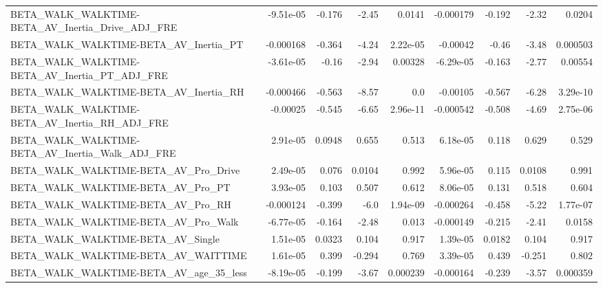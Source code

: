 \begin{tabular}{lrrrrrrrr}
BETA\_WALK\_WALKTIME-BETA\_AV\_Inertia\_Drive\_ADJ\_FRE   &   -9.51e-05 &       -0.176 &    -2.45 &   0.0141 &  -0.000179 &      -0.192 &        -2.32 &        0.0204 \\
BETA\_WALK\_WALKTIME-BETA\_AV\_Inertia\_PT              &   -0.000168 &       -0.364 &    -4.24 & 2.22e-05 &   -0.00042 &       -0.46 &        -3.48 &      0.000503 \\
BETA\_WALK\_WALKTIME-BETA\_AV\_Inertia\_PT\_ADJ\_FRE      &   -3.61e-05 &        -0.16 &    -2.94 &  0.00328 &  -6.29e-05 &      -0.163 &        -2.77 &       0.00554 \\
BETA\_WALK\_WALKTIME-BETA\_AV\_Inertia\_RH              &   -0.000466 &       -0.563 &    -8.57 &      0.0 &   -0.00105 &      -0.567 &        -6.28 &      3.29e-10 \\
BETA\_WALK\_WALKTIME-BETA\_AV\_Inertia\_RH\_ADJ\_FRE      &    -0.00025 &       -0.545 &    -6.65 & 2.96e-11 &  -0.000542 &      -0.508 &        -4.69 &      2.75e-06 \\
BETA\_WALK\_WALKTIME-BETA\_AV\_Inertia\_Walk\_ADJ\_FRE    &    2.91e-05 &       0.0948 &    0.655 &    0.513 &   6.18e-05 &       0.118 &        0.629 &         0.529 \\
BETA\_WALK\_WALKTIME-BETA\_AV\_Pro\_Drive               &    2.49e-05 &        0.076 &   0.0104 &    0.992 &   5.96e-05 &       0.115 &       0.0108 &         0.991 \\
BETA\_WALK\_WALKTIME-BETA\_AV\_Pro\_PT                  &    3.93e-05 &        0.103 &    0.507 &    0.612 &   8.06e-05 &       0.131 &        0.518 &         0.604 \\
BETA\_WALK\_WALKTIME-BETA\_AV\_Pro\_RH                  &   -0.000124 &       -0.399 &     -6.0 & 1.94e-09 &  -0.000264 &      -0.458 &        -5.22 &      1.77e-07 \\
BETA\_WALK\_WALKTIME-BETA\_AV\_Pro\_Walk                &   -6.77e-05 &       -0.164 &    -2.48 &    0.013 &  -0.000149 &      -0.215 &        -2.41 &        0.0158 \\
BETA\_WALK\_WALKTIME-BETA\_AV\_Single                  &    1.51e-05 &       0.0323 &    0.104 &    0.917 &   1.39e-05 &      0.0182 &        0.104 &         0.917 \\
BETA\_WALK\_WALKTIME-BETA\_AV\_WAITTIME                &    1.61e-05 &        0.399 &   -0.294 &    0.769 &   3.39e-05 &       0.439 &       -0.251 &         0.802 \\
BETA\_WALK\_WALKTIME-BETA\_AV\_age\_35\_less             &   -8.19e-05 &       -0.199 &    -3.67 & 0.000239 &  -0.000164 &      -0.239 &        -3.57 &      0.000359 \\

\end{tabular}
